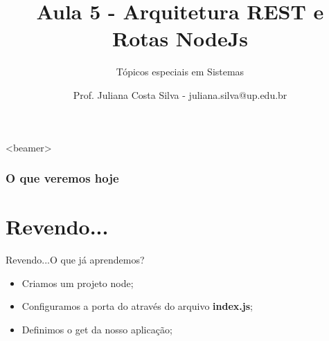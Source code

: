 \documentclass{beamer}
\title{Aula 5  - Arquitetura REST e Rotas NodeJs}
\subtitle{Tópicos especiais em Sistemas}
\author{Prof. Juliana Costa Silva - juliana.silva@up.edu.br}
\begin{document}
  \frame[c]{\maketitle}
      \begin{frame}<beamer>
      \frametitle{O que veremos hoje}
      \tableofcontents
    \end{frame}
    \section{Revendo...}
    \begin{frame}{Revendo...}{O que já aprendemos?}
      
      \begin{itemize}
            \item Criamos um projeto node;
            \item Configuramos a porta do através do arquivo \textbf{index.js};
            \item Definimos o get da nosso aplicação;
       \end{itemize}
     \end{frame}
\end{document}
